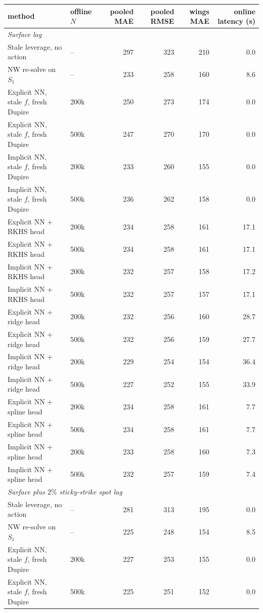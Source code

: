 \begin{tabular}{l l rr r r}
\toprule
method & offline $N$ & pooled MAE & pooled RMSE & wings MAE & online latency (s)\\
\midrule
\multicolumn{6}{l}{\emph{Surface lag}}\\
Stale leverage, no action & -- & 297 & 323 & 210 & 0.0\\
NW re-solve on $S_1$ & -- & 233 & 258 & 160 & 8.6\\
Explicit NN, stale $f$, fresh Dupire & 200k & 250 & 273 & 174 & 0.0\\
Explicit NN, stale $f$, fresh Dupire & 500k & 247 & 270 & 170 & 0.0\\
Implicit NN, stale $f$, fresh Dupire & 200k & 233 & 260 & 155 & 0.0\\
Implicit NN, stale $f$, fresh Dupire & 500k & 236 & 262 & 158 & 0.0\\
Explicit NN + RKHS head & 200k & 234 & 258 & 161 & 17.1\\
Explicit NN + RKHS head & 500k & 234 & 258 & 161 & 17.1\\
Implicit NN + RKHS head & 200k & 232 & 257 & 158 & 17.2\\
Implicit NN + RKHS head & 500k & 232 & 257 & 157 & 17.1\\
Explicit NN + ridge head & 200k & 232 & 256 & 160 & 28.7\\
Explicit NN + ridge head & 500k & 232 & 256 & 159 & 27.7\\
Implicit NN + ridge head & 200k & 229 & 254 & 154 & 36.4\\
Implicit NN + ridge head & 500k & 227 & 252 & 155 & 33.9\\
Explicit NN + spline head & 200k & 234 & 258 & 161 & 7.7\\
Explicit NN + spline head & 500k & 234 & 258 & 161 & 7.7\\
Implicit NN + spline head & 200k & 233 & 258 & 160 & 7.3\\
Implicit NN + spline head & 500k & 232 & 257 & 159 & 7.4\\
\midrule
\multicolumn{6}{l}{\emph{Surface plus $2\%$ sticky-strike spot lag}}\\
Stale leverage, no action & -- & 281 & 313 & 195 & 0.0\\
NW re-solve on $S_1$ & -- & 225 & 248 & 154 & 8.5\\
Explicit NN, stale $f$, fresh Dupire & 200k & 227 & 253 & 155 & 0.0\\
Explicit NN, stale $f$, fresh Dupire & 500k & 225 & 251 & 152 & 0.0\\

\end{tabular}
